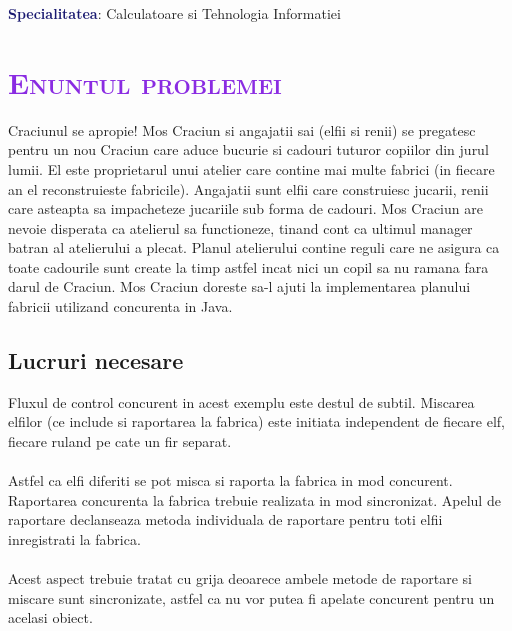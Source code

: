 \documentclass{article}
\begin{document}
\LARGE
\vspace{1em}
\textbf{\textcolor{MidnightBlue}{{Specialitatea}}}: Calculatoare si Tehnologia Informatiei



\newpage
\renewcommand*\contentsname{\centering \textcolor{blue}{{ Cuprins}}\\
\vspace{1cm} } 
\large \tableofcontents
\newpage
\section{\bfseries\scshape\textcolor{BlueViolet}{Enuntul problemei}}
Craciunul se apropie! Mos Craciun si angajatii sai (elfii si renii) se pregatesc pentru un nou Craciun care aduce bucurie si cadouri tuturor copiilor din jurul lumii.
El este proprietarul unui atelier care contine mai multe fabrici (in fiecare an el reconstruieste fabricile). Angajatii sunt elfii care construiesc jucarii, renii care asteapta sa impacheteze jucariile sub forma de cadouri. Mos Craciun are nevoie disperata ca atelierul sa functioneze, tinand cont ca ultimul manager
batran al atelierului a plecat. Planul atelierului contine reguli care ne asigura ca toate cadourile sunt create la timp astfel incat nici un copil sa nu ramana fara darul de Craciun. Mos Craciun doreste sa-l ajuti la implementarea planului fabricii utilizand concurenta in Java.


\subsection{\textcolor{Periwinkle}{Lucruri necesare}}
Fluxul de control concurent in acest exemplu este destul de subtil. Miscarea elfilor (ce include si raportarea la fabrica) este initiata independent de fiecare elf, fiecare ruland pe cate un fir separat. \\
\\
Astfel ca elfi diferiti se pot misca si raporta la fabrica in mod concurent. Raportarea concurenta la fabrica trebuie realizata in mod sincronizat.
Apelul de raportare declanseaza metoda individuala de raportare pentru toti elfii inregistrati la fabrica.\\
\\
Acest aspect trebuie tratat cu grija deoarece ambele metode de raportare si miscare sunt sincronizate, astfel ca nu vor putea fi apelate concurent pentru un acelasi obiect.
\end{document}

